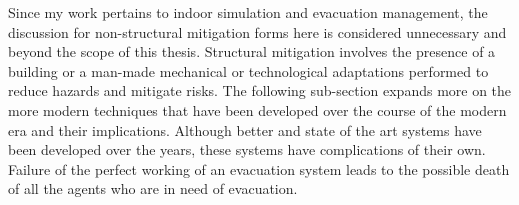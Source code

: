 Since my work pertains to indoor simulation and evacuation management, the discussion for non-structural mitigation forms here is considered unnecessary and beyond the scope of this thesis. Structural mitigation involves the presence of a building or a man-made mechanical or technological adaptations performed to reduce hazards and mitigate risks. The following sub-section expands more on the more modern techniques that have been developed over the course of the modern era and their implications. Although better and state of the art systems have been developed over the years, these systems have complications of their own. Failure of the perfect working of an evacuation system leads to the possible death of all the agents who are in need of evacuation. 
